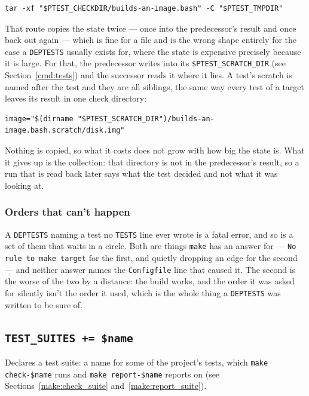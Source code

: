 \documentclass{article}
\begin{document}
\begin{verbatim}
tar -xf "$PTEST_CHECKDIR/builds-an-image.bash" -C "$PTEST_TMPDIR"
\end{verbatim}

That route copies the state twice --- once into the predecessor's
result and once back out again --- which is fine for a file and is the
wrong shape entirely for the case a \texttt{DEPTESTS} usually exists
for, where the state is expensive precisely because it is large.  For
that, the predecessor writes into its
\texttt{\$PTEST\_SCRATCH\_DIR} (see Section~\ref{cmd:tests}) and the
successor reads it where it lies.  A test's scratch is named after the
test and they are all siblings, the same way every test of a target
leaves its result in one check directory:

\begin{verbatim}
image="$(dirname "$PTEST_SCRATCH_DIR")/builds-an-image.bash.scratch/disk.img"
\end{verbatim}

Nothing is copied, so what it costs does not grow with how big the
state is.  What it gives up is the collection: that directory is not
in the predecessor's result, so a run that is read back later says
what the test decided and not what it was looking at.

\subsubsection{Orders that can't happen}

A \texttt{DEPTESTS} naming a test no \texttt{TESTS} line ever wrote is
a fatal error, and so is a set of them that waits in a circle.  Both
are things \texttt{make} has an answer for --- \texttt{No rule to make
target} for the first, and quietly dropping an edge for the second ---
and neither answer names the \texttt{Configfile} line that caused it.
The second is the worse of the two by a distance: the build works, and
the order it was asked for silently isn't the order it used, which is
the whole thing a \texttt{DEPTESTS} was written to be sure of.

\subsection{\texttt{TEST\_SUITES += \$name} \label{cmd:test_suites}}

Declares a test suite: a name for some of the project's tests, which
\texttt{make check-\$name} runs and \texttt{make report-\$name}
reports on (see Sections~\ref{make:check_suite}
and~\ref{make:report_suite}).
\end{document}
